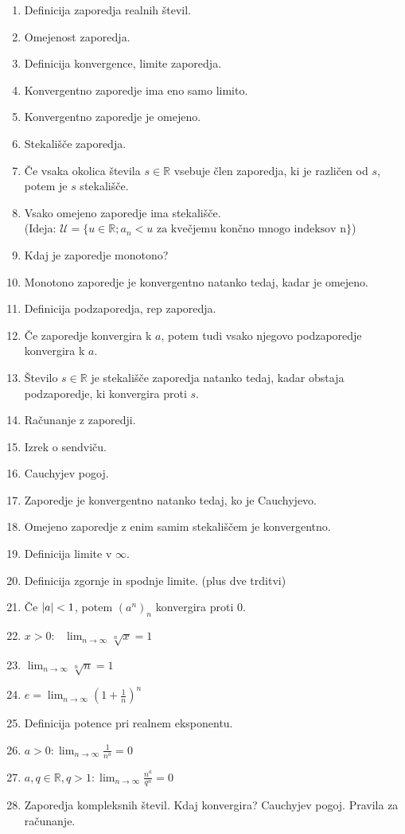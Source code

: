 \documentclass[a4paper,12pt]{report}
\begin{document}
\begin{enumerate}
    \item Definicija zaporedja realnih števil.
    \item Omejenost zaporedja.
    \item Definicija konvergence, limite zaporedja.
    \item Konvergentno zaporedje ima eno samo limito.
    \item Konvergentno zaporedje je omejeno.
    \item Stekališče zaporedja.
    \item Če vsaka okolica števila $s \in \mathbb{R}$ vsebuje člen zaporedja, ki je različen od $s$, potem je $s$ stekališče.
    \item Vsako omejeno zaporedje ima stekališče. \\ (Ideja: $\mathcal{U} = \{ u \in \mathbb{R}; a_n < u \text{ za kvečjemu končno mnogo indeksov n} \}$)
    \item Kdaj je zaporedje monotono?
    \item Monotono zaporedje je konvergentno natanko tedaj, kadar je omejeno.
    \item Definicija podzaporedja, rep zaporedja.
    \item Če zaporedje konvergira k $a$, potem tudi vsako njegovo podzaporedje konvergira k $a$.
    \item Število $s \in \mathbb{R}$ je stekališče zaporedja natanko tedaj, kadar obstaja podzaporedje, ki konvergira proti $s$.
    \item Računanje z zaporedji.
    \item Izrek o sendviču.
    \item Cauchyjev pogoj.
    \item Zaporedje je konvergentno natanko tedaj, ko je Cauchyjevo.
    \item Omejeno zaporedje z enim samim stekališčem je konvergentno.
    \item Definicija limite v $\infty$.
    \item Definicija zgornje in spodnje limite. (plus dve trditvi)
    \item Če $\abs{a} < 1$, potem $(a^n)_n$ konvergira proti 0.
    \item $x > 0: \text{ } \lim_{n \to \infty} \sqrt[n]{x} = 1$
    \item $\lim_{n \to \infty} \sqrt[n]{n} = 1$
    \item $e = \lim_{n \to \infty}(1 + \frac{1}{n})^n$
    \item Definicija potence pri realnem eksponentu.
    \item $a > 0: \lim_{n \to \infty} \frac{1}{n^a} = 0$
    \item $a,q \in \mathbb{R}, q > 1: \lim_{n \to \infty} \frac{n^a}{q^n} = 0$
    \item Zaporedja kompleksnih števil. Kdaj konvergira? Cauchyjev pogoj. Pravila za računanje.
\end{enumerate}
\end{document}
